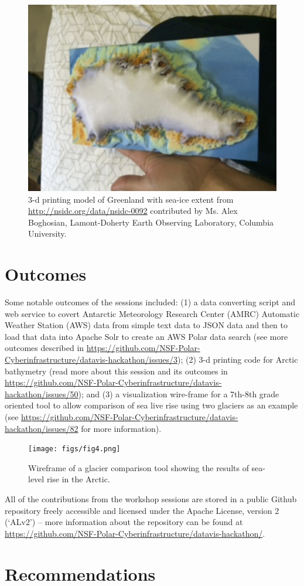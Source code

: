 \documentclass[11pt]{article}
\begin{document}
\begin{figure}[htp]
    \centering
    \includegraphics[width=5in]{figs/fig3.png}
    \caption{3-d printing model of Greenland with sea-ice extent from \protect\url{http://nsidc.org/data/nsidc-0092} contributed by Ms. Alex Boghosian, Lamont-Doherty Earth Observing Laboratory, Columbia University.}
    \label{fig:website}
\end{figure}

\section{Outcomes}
Some notable outcomes of the sessions included: (1) a data converting script and web service to covert Antarctic Meteorology Research Center (AMRC) Automatic Weather Station (AWS) data from simple text data to JSON data and then to load that data into Apache Solr to create an AWS Polar data search (see more outcomes described in \url{https://github.com/NSF-Polar-Cyberinfrastructure/datavis-hackathon/issues/3}); (2) 3-d printing code for Arctic bathymetry (read more about this session and its outcomes in \url{https://github.com/NSF-Polar-Cyberinfrastructure/datavis-hackathon/issues/50}); and (3) a visualization wire-frame for a 7th-8th grade oriented tool to allow comparison of sea live rise using two glaciers as an example (see \url{https://github.com/NSF-Polar-Cyberinfrastructure/datavis-hackathon/issues/82} for more information). 

\begin{figure}[htp]
    \centering
    \texttt{[image: figs/fig4.png]}
    \caption{Wireframe of a glacier comparison tool showing the results of sea-level rise in the Arctic.}
    \label{fig:website}
\end{figure}

All of the contributions from the workshop sessions are stored in a public Github repository freely accessible and licensed under the Apache License, version 2 (`ALv2') -- more information about the repository can be found at \url{https://github.com/NSF-Polar-Cyberinfrastructure/datavis-hackathon/}. 

\section{Recommendations}
\end{document}
